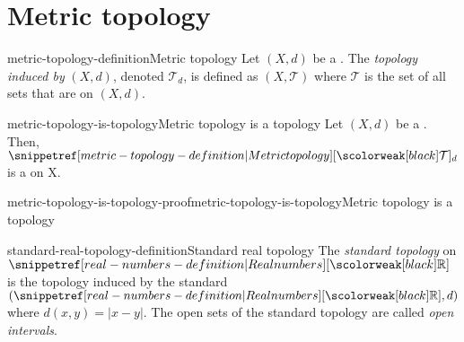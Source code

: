 \documentclass[preview]{standalone}
\begin{document}
\genpage

\newcommand\ts{{(X, \mathcal{T})}}

\section{Metric topology}

\begin{snippetdefinition}{metric-topology-definition}{Metric topology}
    Let \((X, d)\) be a \metricspace. The \textit{topology induced by} \((X, d)\),
    denoted \(\mathcal{T}_d\), is defined as \((X, \mathcal{T})\)
    where \(\mathcal{T}\) is the set of all sets that are \msopenset on \((X, d)\).
\end{snippetdefinition}

\begin{snippetproposition}{metric-topology-is-topology}{Metric topology is a topology}
    Let \((X, d)\) be a \metricspace. Then, \(\metrictopology_d\) is a \topologicalspace[topology][Topology]
    on X.
\end{snippetproposition}

\begin{snippetproof}{metric-topology-is-topology-proof}{metric-topology-is-topology}{Metric topology is a topology}
    \todo
\end{snippetproof}

\begin{snippetdefinition}{standard-real-topology-definition}{Standard real topology}
    The \emph{standard topology} on \(\realnumbers\) is the topology induced by the standard \metricspace
    \((\realnumbers, d)\) where \(d(x,y) = |x - y|\).
    The open sets of the standard topology are called \textit{open intervals}.
\end{snippetdefinition}
\end{document}
